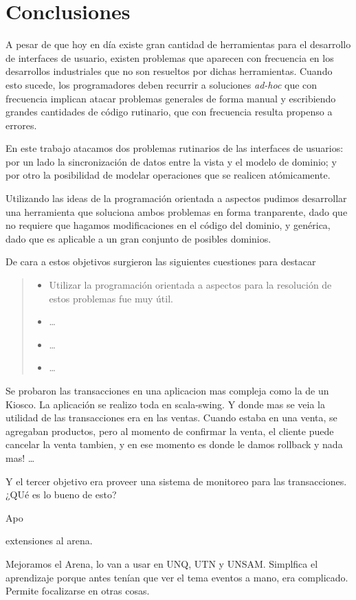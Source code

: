 \section{Conclusiones}
\label{sec:conclusions}
A pesar de que hoy en día existe gran cantidad de herramientas para el
desarrollo de interfaces de usuario, existen problemas que
aparecen con frecuencia en los desarrollos industriales que no son resueltos por
dichas herramientas.
 Cuando esto sucede, los programadores deben recurrir a soluciones \emph{ad-hoc}
que con frecuencia implican atacar problemas generales de forma manual y
escribiendo grandes cantidades de código rutinario, que con frecuencia resulta
propenso a errores.

En este trabajo atacamos dos problemas rutinarios de las interfaces de usuarios:
por un lado la sincronización de datos entre la vista y el modelo de dominio; y
por otro la posibilidad de modelar operaciones que se realicen atómicamente.

Utilizando las ideas de la programación orientada a aspectos pudimos desarrollar
una herramienta que soluciona ambos problemas en forma tranparente, dado que no
requiere que hagamos modificaciones en el código del dominio, y genérica, dado
que es aplicable a un gran conjunto de posibles dominios.

De cara a estos objetivos surgieron las siguientes cuestiones para destacar

\begin{quote}

	\begin{itemize}
	  
		\item Utilizar la programación orientada a aspectos para la resolución de
		estos problemas fue muy útil.
		
		\item  \ldots
		
		\item \ldots
		\item \ldots
	  
	\end{itemize}
	
\end{quote}

Se probaron las transacciones en una aplicacion mas compleja como la de un
Kiosco.
La aplicación se realizo toda en scala-swing. Y donde mas se veia la utilidad de
las transacciones era en las ventas. Cuando estaba en una venta, se agregaban
productos, pero al momento de confirmar la venta, el cliente puede cancelar la
venta tambien, y en ese momento es donde le damos rollback y nada mas! \ldots
{}

Y el tercer objetivo era
proveer una sistema de monitoreo para las transacciones.
¿QUé es lo bueno de esto?

Apo

extensiones al arena.

Mejoramos el Arena, lo van a usar en UNQ, UTN y UNSAM.
Simplfica el aprendizaje porque antes tenían que ver el tema eventos a mano, era
complicado. Permite focalizarse en otras cosas.
